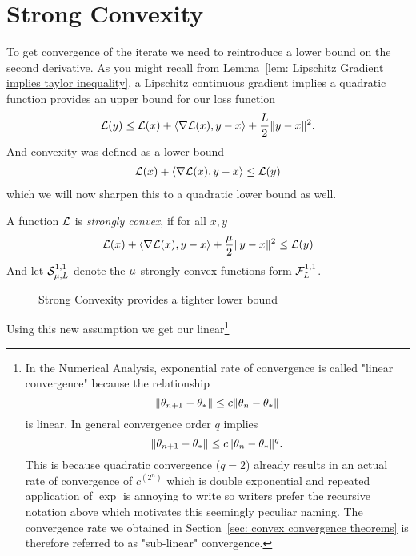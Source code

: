 \section{Strong Convexity}\label{sec: Strong Convexity}

To get convergence of the iterate we need to reintroduce a lower bound on
the second derivative. As you might recall from Lemma~\ref{lem: Lipschitz
Gradient implies taylor inequality}, a Lipschitz continuous gradient implies
a quadratic function provides an upper bound for our loss function
%
\begin{align}\label{eq: upper bound}
	\mathcal{L}(y) \le \mathcal{L}(x) + \langle \nabla \mathcal{L}(x), y-x\rangle + \frac{L}{2}\|y-x\|^2.
\end{align}
%
And convexity was defined as a lower bound
%
\begin{align*}
	\mathcal{L}(x) + \langle \nabla \mathcal{L}(x), y-x\rangle \le \mathcal{L}(y)
\end{align*}
%
which we will now sharpen this to a quadratic lower bound as well.
%
\begin{definition}\label{def: strong convexity}
	A function \(\mathcal{L}\) is \emph{strongly convex}, if for all \(x,y\)
	\begin{align*}
		\mathcal{L}(x) + \langle \nabla \mathcal{L}(x), y-x\rangle + \frac{\mu}{2}\|y-x\|^2 \le \mathcal{L}(y)
	\end{align*}
	And let \(\mathcal{S}^{1,1}_{{\mu},{L}}\) denote the \(\mu\)-strongly convex
	functions form \(\mathcal{F}^{1,1}_{L}\).
\end{definition}
%
\begin{figure}[h]
	\centering
	\def\svgwidth{1\textwidth}
	
	\caption{Strong Convexity provides a tighter lower bound}
	\label{fig: visualize strong convexity}
\end{figure}
%
Using this new assumption we get our linear\footnote{
	In the Numerical Analysis, exponential rate of
	convergence is called "linear convergence" because the relationship
	\[
		\|\theta_{n+1} - \theta_*\| \le c \|\theta_n - \theta_*\|
	\]
	is linear. In
	general convergence order \(q\) implies 
	\[
		\|\theta_{n+1} -\theta_*\| \le c\|\theta_n - \theta_*\|^q.
	\]
	This is because quadratic convergence (\(q=2\)) already results in an actual
	rate of convergence of \(c^{\left(2^n\right)}\) which is double exponential and
	repeated application of \(\exp\) is annoying to write so writers prefer the
	recursive notation above which motivates this seemingly peculiar naming.
	The convergence rate we obtained in Section~\ref{sec: convex convergence theorems}
	is therefore referred to as "sub-linear" convergence.
}
